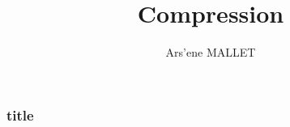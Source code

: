 \documentclass{beamer}
\title{Compression}
\author{Ars'ene MALLET}
\date{}
\begin{document}
\frametitle{\titlepage}

\begin{frame}
    \frametitle{title}
\end{frame}
\end{document}
